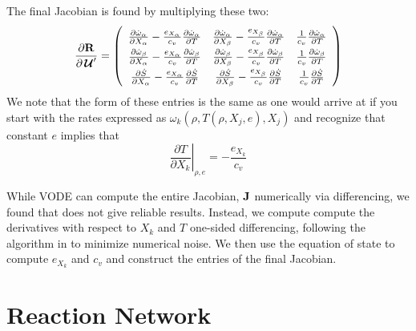 \documentclass{aastex63}
\newcommand{\omegadot}{\dot{\omega}}
\newcommand{\Sdot}{\dot{S}}
\newcommand{\Uc}{{\,\bm{\mathcal{U}}}}
\newcommand{\Rb}{{\bf R}}
\begin{document}
The final Jacobian is found by multiplying these two:
\begin{equation}
\renewcommand{\arraystretch}{1.5}
\frac{\partial \Rb}{\partial \Uc^\prime} = \left (
  \begin{array}{ccc}
    \frac{\partial \omegadot_\alpha}{\partial X_\alpha} - \frac{e_{X_\alpha}}{c_v} \frac{\partial \omegadot_\alpha}{\partial T} &
    \frac{\partial \omegadot_\alpha}{\partial X_\beta} - \frac{e_{X_\beta}}{c_v} \frac{\partial \omegadot_\alpha}{\partial T} &
    \frac{1}{c_v} \frac{\partial \omegadot_\alpha}{\partial T} \\
    \frac{\partial \omegadot_\beta}{\partial X_\alpha} - \frac{e_{X_\alpha}}{c_v} \frac{\partial \omegadot_\beta}{\partial T} &
    \frac{\partial \omegadot_\beta}{\partial X_\beta} - \frac{e_{X_\beta}}{c_v} \frac{\partial \omegadot_\beta}{\partial T} &
    \frac{1}{c_v} \frac{\partial \omegadot_\beta}{\partial T} \\
     \frac{\partial \Sdot}{\partial X_\alpha} -  \frac{e_{X_\alpha}}{c_v} \frac{\partial \Sdot}{\partial T} &
     \frac{\partial \Sdot}{\partial X_\beta} -  \frac{e_{X_\beta}}{c_v} \frac{\partial \Sdot}{\partial T} &
     \frac{1}{c_v} \frac{\partial \Sdot}{\partial T} \\
  \end{array}
  \right )
\renewcommand{\arraystretch}{1}
\end{equation}
We note that the form of these entries is the same as one would arrive at if you start with the rates expressed as
$\omega_k(\rho, T(\rho, X_j, e), X_j)$ and recognize that constant $e$ implies that
\begin{equation}
\left . \frac{\partial T}{\partial X_k} \right |_{\rho, e} = - \frac{e_{X_k}}{c_v}
\end{equation}

While VODE can compute the entire Jacobian, ${\bf J}$ numerically via
differencing, we found that does not give reliable results.  Instead,
we compute compute the derivatives with respect to $X_k$ and $T$
one-sided differencing, following the algorithm in \cite{lsode} to
minimize numerical noise.  We then use the equation of state to
compute $e_{X_k}$ and $c_v$ and construct the entries of the final
Jacobian.

\section{Reaction Network}
\end{document}
